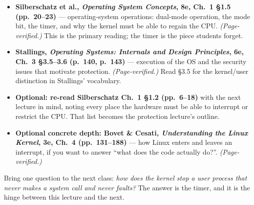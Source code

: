 \documentclass[11pt]{article}
\begin{document}
\begin{itemize}
  \item \textbf{Silberschatz et al., \emph{Operating System Concepts}, 8e, Ch.~1
    \S1.5 (pp.~20--23)} --- operating-system operations: dual-mode operation, the
    mode bit, the timer, and why the kernel must be able to regain the CPU.
    \emph{(Page-verified.)} This is the primary reading; the timer is the piece
    students forget.
  \item \textbf{Stallings, \emph{Operating Systems: Internals and Design
    Principles}, 6e, Ch.~3 \S3.5--3.6 (p.~140, p.~143)} --- execution of the OS
    and the security issues that motivate protection. \emph{(Page-verified.)}
    Read \S3.5 for the kernel/user distinction in Stallings' vocabulary.
  \item \textbf{Optional: re-read Silberschatz Ch.~1 \S1.2 (pp.~6--18)} with the
    next lecture in mind, noting every place the hardware must be able to
    interrupt or restrict the CPU. That list becomes the protection lecture's
    outline.
  \item \textbf{Optional concrete depth: Bovet \& Cesati, \emph{Understanding the
    Linux Kernel}, 3e, Ch.~4 (pp.~131--188)} --- how Linux enters and leaves an
    interrupt, if you want to answer ``what does the code actually do?''.
    \emph{(Page-verified.)}
\end{itemize}

Bring one question to the next class: \emph{how does the kernel stop a user
process that never makes a system call and never faults?} The answer is the
timer, and it is the hinge between this lecture and the next.
\end{document}
